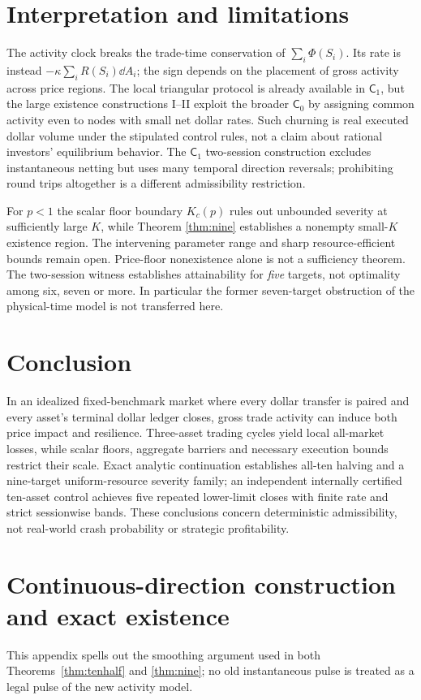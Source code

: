 \documentclass[review,hidelinks,onefignum,onetabnum]{siamonline250211}%
\begin{document}
\section{Interpretation and limitations}\label{sec:discussion}
The activity clock breaks the trade-time conservation of
$\sum_i\Phi(S_i)$. Its rate is instead
$-\kappa\sum_iR(S_i)\dd A_i$; the sign depends on the placement
of gross activity across price regions. The local triangular protocol
is already available in $\mathsf C_1$, but the large existence
constructions I--II exploit the broader $\mathsf C_0$ by assigning
common activity even to nodes with small net dollar rates. Such
churning is real executed dollar volume under the stipulated control
rules, not a claim about rational investors' equilibrium behavior.
The $\mathsf C_1$ two-session construction excludes instantaneous
netting but uses many temporal direction reversals; prohibiting
round trips altogether is a different admissibility restriction.

For $p<1$ the scalar floor boundary $K_c(p)$ rules out
unbounded severity at sufficiently large $K$, while Theorem
\ref{thm:nine} establishes a nonempty small-$K$ existence region.
The intervening parameter range and sharp resource-efficient bounds
remain open. Price-floor nonexistence alone is not a sufficiency
theorem. The two-session witness establishes attainability for
\emph{five} targets, not optimality among six, seven or more.
In particular the former seven-target obstruction of the
physical-time model is not transferred here.

\section{Conclusion}
In an idealized fixed-benchmark market where every dollar transfer
is paired and every asset's terminal dollar ledger closes, gross
trade activity can induce both price impact and resilience.
Three-asset trading cycles yield local all-market losses, while
scalar floors, aggregate barriers and necessary execution bounds
restrict their scale. Exact analytic continuation establishes
all-ten halving and a nine-target uniform-resource severity family;
an independent internally certified ten-asset control achieves
five repeated lower-limit closes with finite rate and strict
sessionwise bands. These conclusions concern deterministic
admissibility, not real-world crash probability or strategic
profitability.

\appendix
\section{Continuous-direction construction and exact existence}\label{app:smoothing}
This appendix spells out the smoothing argument used in both
Theorems~\ref{thm:tenhalf} and \ref{thm:nine}; no old instantaneous
pulse is treated as a legal pulse of the new activity model.
\end{document}
